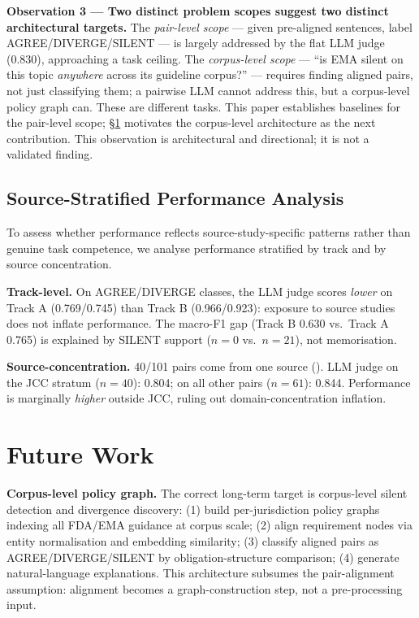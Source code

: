 \documentclass[manuscript]{acmart}
\begin{document}
\textbf{Observation 3 --- Two distinct problem scopes suggest two distinct
architectural targets.} The \textit{pair-level scope} --- given pre-aligned
sentences, label AGREE/DIVERGE/SILENT --- is largely addressed by the flat
LLM judge (0.830), approaching a task ceiling. The \textit{corpus-level scope}
--- ``is EMA silent on this topic \textit{anywhere} across its guideline
corpus?'' --- requires finding aligned pairs, not just classifying them; a
pairwise LLM cannot address this, but a corpus-level policy graph can. These
are different tasks. This paper establishes baselines for the pair-level scope;
\S\ref{sec:futurework} motivates the corpus-level architecture as the next
contribution. This observation is architectural and directional; it is not a
validated finding.

\subsection{Source-Stratified Performance Analysis}
\label{sec:source_stratified}

To assess whether performance reflects source-study-specific patterns rather
than genuine task competence, we analyse performance stratified by track and
by source concentration.

\textbf{Track-level.} On AGREE/DIVERGE classes, the LLM judge scores
\textit{lower} on Track A (0.769/0.745) than Track B (0.966/0.923): exposure
to source studies does not inflate performance. The macro-F1 gap (Track B 0.630
vs.\ Track A 0.765) is explained by SILENT support ($n = 0$ vs.\ $n = 21$),
not memorisation.

\textbf{Source-concentration.} 40/101 pairs come from one source
(\citeauthor{uc2025jcc}). LLM judge on the JCC stratum ($n = 40$): 0.804;
on all other pairs ($n = 61$): 0.844. Performance is marginally
\textit{higher} outside JCC, ruling out domain-concentration inflation.

\section{Future Work}
\label{sec:futurework}

\textbf{Corpus-level policy graph.}
The correct long-term target is corpus-level silent detection and divergence
discovery: (1) build per-jurisdiction policy graphs indexing all FDA/EMA
guidance at corpus scale; (2) align requirement nodes via entity normalisation
and embedding similarity; (3) classify aligned pairs as AGREE/DIVERGE/SILENT by
obligation-structure comparison; (4) generate natural-language explanations.
This architecture subsumes the pair-alignment assumption: alignment becomes a
graph-construction step, not a pre-processing input.
\end{document}
